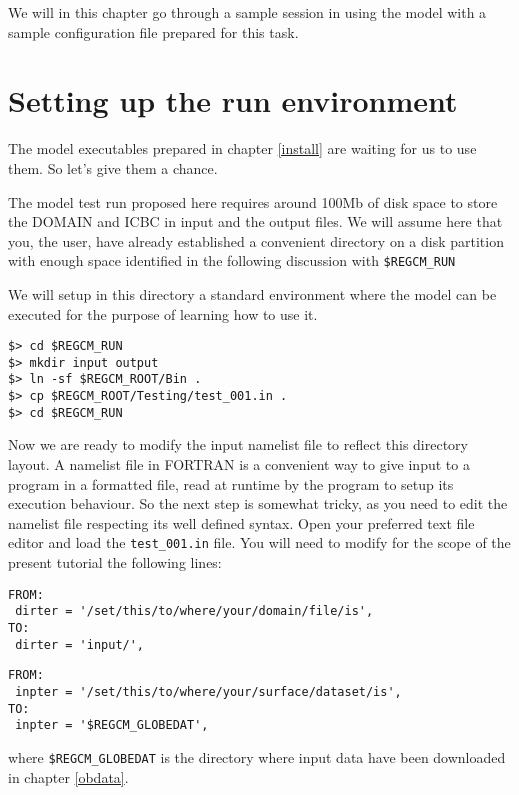 %
%

We will in this chapter go through a sample session in using the model with
a sample configuration file prepared for this task.

\section{Setting up the run environment}

The model executables prepared in chapter \ref{install} are waiting for us to
use them. So let's give them a chance.

The model test run proposed here requires around 100Mb of disk space to store
the DOMAIN and ICBC in input and the output files. We will assume here that you,
the user, have already established a convenient directory on a disk partition
with enough space identified in the following discussion with \verb=$REGCM_RUN=

We will setup in this directory a standard environment where the model can be
executed for the purpose of learning how to use it.

\begin{Verbatim}
$> cd $REGCM_RUN
$> mkdir input output
$> ln -sf $REGCM_ROOT/Bin .
$> cp $REGCM_ROOT/Testing/test_001.in .
$> cd $REGCM_RUN
\end{Verbatim}

Now we are ready to modify the input namelist file to reflect this directory
layout. A namelist file in FORTRAN is a convenient way to give input to a
program in a formatted file, read at runtime by the program to setup its
execution behaviour. So the next step is somewhat tricky, as you need to edit
the namelist file respecting its well defined syntax. Open your preferred text
file editor and load the \verb=test_001.in= file. You will need to modify for
the scope of the present tutorial the following lines:

\begin{Verbatim}
FROM:
 dirter = '/set/this/to/where/your/domain/file/is',
TO:
 dirter = 'input/',
\end{Verbatim}

\begin{Verbatim}
FROM:
 inpter = '/set/this/to/where/your/surface/dataset/is',
TO:
 inpter = '$REGCM_GLOBEDAT',
\end{Verbatim}

where \verb=$REGCM_GLOBEDAT= is the directory where input data have been
downloaded in chapter \ref{obdata}.

